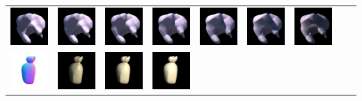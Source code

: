 \begin{center}
\begin{longtable}{@{}c@{}c@{}c@{}c@{}c@{}c@{}c@{}c@{}c@{}}
\includegraphics[width=0.1\linewidth]{training/15_1.png} & \includegraphics[width=0.1\linewidth]{training/15_2.png} &
\includegraphics[width=0.1\linewidth]{training/15_3.png} & \includegraphics[width=0.1\linewidth]{training/15_4.png} &
\includegraphics[width=0.1\linewidth]{training/15_5.png} & \includegraphics[width=0.1\linewidth]{training/15_6.png} &
\includegraphics[width=0.1\linewidth]{training/15_7.png} \\
\includegraphics[width=0.1\linewidth]{training/16_gt.png} & \includegraphics[width=0.1\linewidth]{training/16_0.png} &
\includegraphics[width=0.1\linewidth]{training/16_1.png} & \includegraphics[width=0.1\linewidth]{training/16_2.png} &

\end{longtable}
\end{center}
